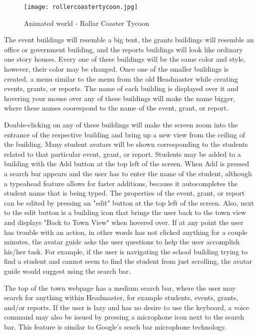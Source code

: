 \documentclass[11pt]{article}
\begin{document}
\begin{figure}[h]
\centering
\texttt{[image: rollercoastertycoon.jpg]}
\caption{Animated world - Rollar Coaster Tycoon}
\label{RCT}
\end{figure}

The event buildings will resemble a big tent, the grants buildings will resemble an office or government building, and the reports buildings will look like ordinary one story houses. Every one of these buildings will be the same color and style, however, their color may be changed. Once one of the smaller buildings is created, a menu similar to the menu from the old Headmaster while creating events, grants, or reports. The name of each building is displayed over it and hovering your mouse over any of these buildings will make the name bigger, where these names coorespond to the name of the event, grant, or report.

Double-clicking on any of these buildings will make the screen zoom into the entrance of the respective building and bring up a new view from the ceiling of the building. Many student avatars \cite{xbox} will be shown corresponding to the students related to that particular event, grant, or report. Students may be added to a building with the Add button at the top left of the screen. When Add is pressed a search bar appears and the user has to enter the name of the student, although a typeahead feature allows for faster additions, because it autocompletes the student name that is being typed. The properties of the event, grant, or report can be edited by pressing an "edit" button at the top left of the screen. Also, next to the edit button is a building icon that brings the user back to the town view and displays "Back to Town View" when hovered over. If at any point the user has trouble with an action, in other words has not clicked anything for a couple minutes, the avatar guide asks the user questions to help the user accomplish his/her task. For example, if the user is navigating the school building trying to find a student and cannot seem to find the student from just scrolling, the avatar guide would suggest using the search bar.

 The top of the town webpage has a medium search bar, where the user may search for anything within Headmaster, for example students, events, grants, and/or reports. If the user is lazy and has no desire to use the keyboard, a voice command may also be issued by pressing a microphone icon next to the search bar. This feature is similar to Google's seach bar microphone technology. 
\end{document}
